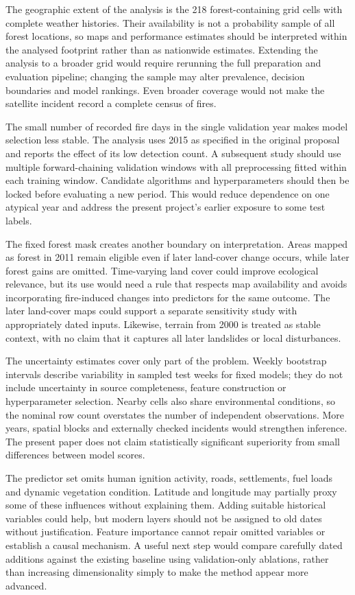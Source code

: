 \documentclass[conference,a4paper]{IEEEtran}
\begin{document}
The geographic extent of the analysis is the 218 forest-containing grid cells with complete weather histories. Their availability is not a probability sample of all forest locations, so maps and performance estimates should be interpreted within the analysed footprint rather than as nationwide estimates. Extending the analysis to a broader grid would require rerunning the full preparation and evaluation pipeline; changing the sample may alter prevalence, decision boundaries and model rankings. Even broader coverage would not make the satellite incident record a complete census of fires.

The small number of recorded fire days in the single validation year makes model selection less stable. The analysis uses 2015 as specified in the original proposal and reports the effect of its low detection count. A subsequent study should use multiple forward-chaining validation windows with all preprocessing fitted within each training window. Candidate algorithms and hyperparameters should then be locked before evaluating a new period. This would reduce dependence on one atypical year and address the present project's earlier exposure to some test labels.

The fixed forest mask creates another boundary on interpretation. Areas mapped as forest in 2011 remain eligible even if later land-cover change occurs, while later forest gains are omitted. Time-varying land cover could improve ecological relevance, but its use would need a rule that respects map availability and avoids incorporating fire-induced changes into predictors for the same outcome. The later land-cover maps could support a separate sensitivity study with appropriately dated inputs. Likewise, terrain from 2000 is treated as stable context, with no claim that it captures all later landslides or local disturbances.

The uncertainty estimates cover only part of the problem. Weekly bootstrap intervals describe variability in sampled test weeks for fixed models; they do not include uncertainty in source completeness, feature construction or hyperparameter selection. Nearby cells also share environmental conditions, so the nominal row count overstates the number of independent observations. More years, spatial blocks and externally checked incidents would strengthen inference. The present paper does not claim statistically significant superiority from small differences between model scores.

The predictor set omits human ignition activity, roads, settlements, fuel loads and dynamic vegetation condition. Latitude and longitude may partially proxy some of these influences without explaining them. Adding suitable historical variables could help, but modern layers should not be assigned to old dates without justification. Feature importance cannot repair omitted variables or establish a causal mechanism. A useful next step would compare carefully dated additions against the existing baseline using validation-only ablations, rather than increasing dimensionality simply to make the method appear more advanced.
\end{document}
